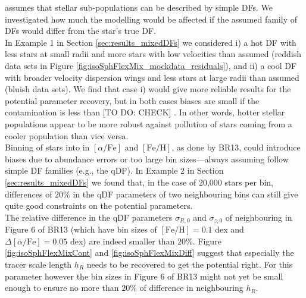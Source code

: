 
 \RM{} assumes that stellar sub-populations can be described by simple DFs. We investigated how much the modelling would be affected if the assumed family of DFs would differ from the star's true DF.
\\In Example 1 in Section \ref{sec:results_mixedDFs} we considered i) a hot DF with less stars at small radii and more stars with low velocities than assumed (reddish data sets in Figure \ref{fig:isoSphFlexMix_mockdata_residuals}), and ii) a cool DF with broader velocity dispersion wings and less stars at large radii than assumed (bluish data sets).  We find that case i) would give more reliable results for the potential parameter recovery, but in both cases biases are small if the contamination is less than [TO DO: CHECK] . In other words, hotter stellar populations appear to be more robust against pollution of stars coming from a cooler population than vice versa. 
\\Binning of stars into \MAPs{} in $[\alpha/\mathrm{Fe}]$ and $[\mathrm{Fe}/\mathrm{H}]$, as done by BR13, could introduce biases due to abundance errors or too large bin sizes---always assuming \MAPs{} follow simple DF families (e.g., the qDF). In Example 2 in Section \ref{sec:results_mixedDFs} we found that, in the case of 20,000 stars per bin, differences of $20\%$ in the qDF parameters of two neighbouring bins can still give quite good constraints on the potential parameters.
\\The relative difference in the qDF parameters $\sigma_{R,0}$ and $\sigma_{z,0}$ of neighbouring \MAPs{} in Figure 6 of BR13 (which have bin sizes of $[\mathrm{Fe}/\mathrm{H}] = 0.1$ dex and $\Delta [\alpha/\mathrm{Fe}] = 0.05$ dex) are indeed smaller than $20\%$. Figure \ref{fig:isoSphFlexMixCont} and \ref{fig:isoSphFlexMixDiff} suggest that especially the tracer scale length $h_R$ needs to be recovered to get the potential right. For this parameter however the bin sizes in Figure 6 of BR13 might not yet be small enough to ensure no more than $20\%$ of difference in neighbouring $h_R$.\\


